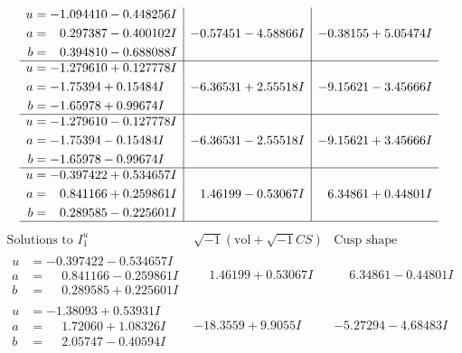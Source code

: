 \documentclass[1p]{elsarticle_modified}
\theoremstyle{definition}
\newcommand{\I}{\sqrt{-1}}
\begin{document}
$$\begin{array}{c|c|c}
\begin{aligned}
u &= -1.094410 - 0.448256 I \\
a &= \phantom{-}0.297387 - 0.400102 I \\
b &= \phantom{-}0.394810 - 0.688088 I\end{aligned}
 & -0.57451 - 4.58866 I & -0.38155 + 5.05474 I \\ \hline\begin{aligned}
u &= -1.279610 + 0.127778 I \\
a &= -1.75394 + 0.15484 I \\
b &= -1.65978 + 0.99674 I\end{aligned}
 & -6.36531 + 2.55518 I & -9.15621 - 3.45666 I \\ \hline\begin{aligned}
u &= -1.279610 - 0.127778 I \\
a &= -1.75394 - 0.15484 I \\
b &= -1.65978 - 0.99674 I\end{aligned}
 & -6.36531 - 2.55518 I & -9.15621 + 3.45666 I \\ \hline\begin{aligned}
u &= -0.397422 + 0.534657 I \\
a &= \phantom{-}0.841166 + 0.259861 I \\
b &= \phantom{-}0.289585 - 0.225601 I\end{aligned}
 & \phantom{-}1.46199 - 0.53067 I & \phantom{-}6.34861 + 0.44801 I\\
 \hline 
 \end{array}$$\newpage$$\begin{array}{c|c|c}  
\text{Solutions to }I^u_{1}& \I (\text{vol} + \sqrt{-1}CS) & \text{Cusp shape}\\
 \hline 
\begin{aligned}
u &= -0.397422 - 0.534657 I \\
a &= \phantom{-}0.841166 - 0.259861 I \\
b &= \phantom{-}0.289585 + 0.225601 I\end{aligned}
 & \phantom{-}1.46199 + 0.53067 I & \phantom{-}6.34861 - 0.44801 I \\ \hline\begin{aligned}
u &= -1.38093 + 0.53931 I \\
a &= \phantom{-}1.72060 + 1.08326 I \\
b &= \phantom{-}2.05747 - 0.40594 I\end{aligned}
 & -18.3559 + 9.9055 I & -5.27294 - 4.68483 I \\ \hline\begin{aligned}

\end{aligned}
\end{array}$$
\end{document}
